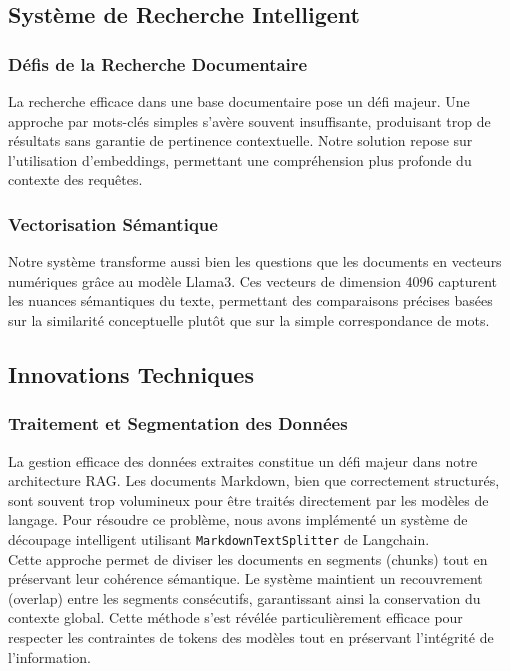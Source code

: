 \documentclass{article}
\begin{document}
\subsection{Système de Recherche Intelligent}
    \subsubsection{Défis de la Recherche Documentaire}
    \quad La recherche efficace dans une base documentaire pose un défi majeur. Une approche par mots-clés simples s'avère souvent insuffisante, produisant trop de résultats sans garantie de pertinence contextuelle. Notre solution repose sur l'utilisation d'embeddings, permettant une compréhension plus profonde du contexte des requêtes.
    
    \subsubsection{Vectorisation Sémantique}
    \quad Notre système transforme aussi bien les questions que les documents en vecteurs numériques grâce au modèle Llama3. Ces vecteurs de dimension 4096 capturent les nuances sémantiques du texte, permettant des comparaisons précises basées sur la similarité conceptuelle plutôt que sur la simple correspondance de mots.

\subsection{Innovations Techniques}
    \subsubsection{Traitement et Segmentation des Données}
    \quad La gestion efficace des données extraites constitue un défi majeur dans notre architecture RAG. Les documents Markdown, bien que correctement structurés, sont souvent trop volumineux pour être traités directement par les modèles de langage. Pour résoudre ce problème, nous avons implémenté un système de découpage intelligent utilisant \texttt{MarkdownTextSplitter} de Langchain.\\
    
    Cette approche permet de diviser les documents en segments (chunks) tout en préservant leur cohérence sémantique. Le système maintient un recouvrement (overlap) entre les segments consécutifs, garantissant ainsi la conservation du contexte global. Cette méthode s'est révélée particulièrement efficace pour respecter les contraintes de tokens des modèles tout en préservant l'intégrité de l'information.
    
\end{document}
